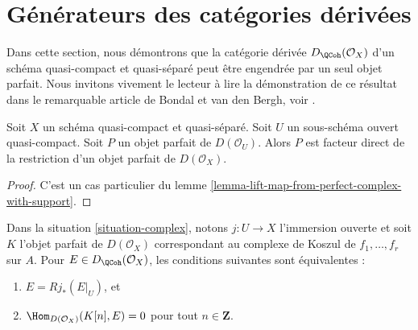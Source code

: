 \section{Générateurs des catégories dérivées}
\label{section-generating}

\noindent
Dans cette section, nous démontrons que la catégorie dérivée
$D_\QCoh(\mathcal{O}_X)$ d'un schéma quasi-compact
et quasi-séparé peut être engendrée par un seul objet parfait.
Nous invitons vivement le lecteur à lire la démonstration de ce résultat dans le remarquable article de
Bondal et van den Bergh, voir \cite{BvdB}.

\begin{lemma}
\label{lemma-direct-summand-of-a-restriction}
Soit $X$ un schéma quasi-compact et quasi-séparé.
Soit $U$ un sous-schéma ouvert quasi-compact.
Soit $P$ un objet parfait de $D(\mathcal{O}_U)$.
Alors $P$ est facteur direct de la restriction d'un objet parfait
de $D(\mathcal{O}_X)$.
\end{lemma}

\begin{proof}
C'est un cas particulier du lemme \ref{lemma-lift-map-from-perfect-complex-with-support}.
\end{proof}

\begin{lemma}
\label{lemma-orthogonal-koszul-complex}
\begin{reference}
\cite[proposition 6.1]{Bokstedt-Neeman}
\end{reference}
Dans la situation \ref{situation-complex}, notons $j : U \to X$ l'immersion
ouverte et soit $K$ l'objet parfait de $D(\mathcal{O}_X)$
correspondant au complexe de Koszul de $f_1, \ldots, f_r$ sur $A$.
Pour $E \in D_\QCoh(\mathcal{O}_X)$, les conditions suivantes sont équivalentes :
\begin{enumerate}
\item $E = Rj_*(E|_U)$, et
\item $\Hom_{D(\mathcal{O}_X)}(K[n], E) = 0$ pour tout $n \in \mathbf{Z}$.
\end{enumerate}
\end{lemma}

